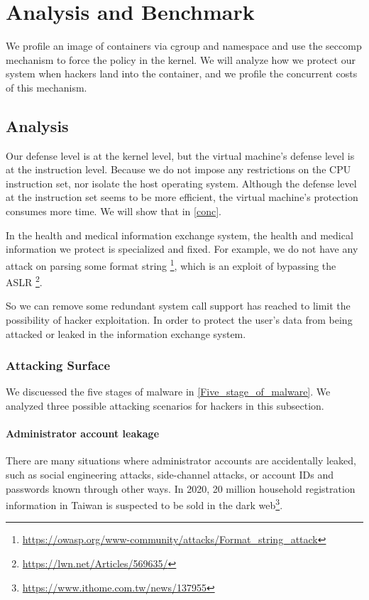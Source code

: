 \chapter{Analysis and Benchmark}

We profile an image of containers via cgroup and namespace
and use the seccomp mechanism to force the policy in the kernel.
We will analyze how we protect our system when hackers land
into the container, and we profile the concurrent costs of this
mechanism.

\section{Analysis}
Our defense level is at the kernel level, but the virtual machine's
defense level is at the instruction level. Because we do not impose any
restrictions on the CPU instruction set, nor isolate the host operating system.
Although the defense level at the instruction set seems to be more efficient,
the virtual machine's protection consumes more time. We will show that in \ref{conc}.

In the health and medical information exchange system, the health and
medical information we protect is specialized and fixed. For example,
we do not have any attack on parsing some format string
\footnote{\url{https://owasp.org/www-community/attacks/Format_string_attack}},
which is an exploit of bypassing the ASLR \footnote{\url{https://lwn.net/Articles/569635/}}.

So we can remove some redundant system call support has reached to
limit the possibility of hacker exploitation. In order to protect
the user's data from being attacked or leaked in the information exchange system.

\subsection{Attacking Surface}
We discuessed the five stages of malware in \ref{Five_stage_of_malware}. We analyzed
three possible attacking scenarios for hackers in this subsection.

\subsubsection{Administrator account leakage}
There are many situations where administrator accounts are accidentally
leaked, such as social engineering attacks, side-channel attacks,
or account IDs and passwords known through other ways.
In 2020, 20 million household registration information in Taiwan is
suspected to be sold in the dark web\footnote{\url{https://www.ithome.com.tw/news/137955}}.

